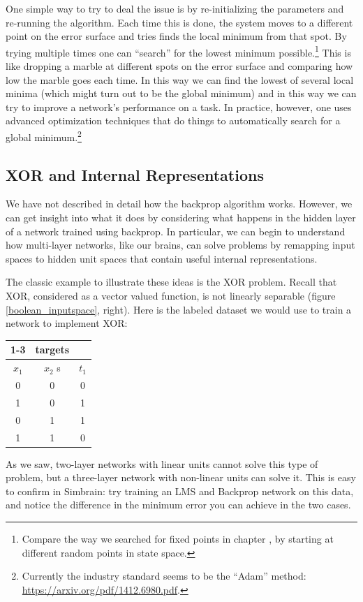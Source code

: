 One simple way to try to deal the issue is by re-initializing the parameters and re-running the algorithm. Each time this is done, the system moves to a different point on the error surface and tries finds the local minimum from that spot. By trying multiple times one can ``search'' for the lowest minimum possible.\footnote{Compare the way we searched for fixed points in chapter , by starting at different random points in state space.}  This is like dropping a marble at different spots on the error surface and comparing how low the marble goes each time. In this way we can find the lowest of several local minima (which might turn out to be the global minimum) and in this way we can try to improve a network's performance on a task. In practice, however, one uses advanced optimization techniques that do things to automatically search for a global minimum.\footnote{Currently the industry standard seems to be the ``Adam'' method: \url{https://arxiv.org/pdf/1412.6980.pdf}.}

\subsection{XOR and Internal Representations}

We have not described in detail how the backprop algorithm works. However, we can get insight into what it does by considering what happens in the hidden layer of a network trained using backprop. In particular, we can begin to understand how multi-layer networks, like our brains, can solve problems by remapping input spaces to hidden unit spaces that contain useful internal representations. 

The classic example to illustrate these ideas is the XOR problem. Recall that XOR, considered as a vector valued function, is not linearly separable (figure \ref{boolean_inputspace}, right). Here is the labeled dataset we would use to train a network to implement XOR:
\begin{center}
\begin{tabular}{| c | c || c | }
\cline{1-3}
\multicolumn{2}{| c || }{inputs}
 & \multicolumn{1}{c|}{targets} \\
\hline
  $x_1$  & $x_2$ s& $t_1$  \\
\hline
  0 & 0 & 0  \\
\hline
 1 & 0 & 1  \\
\hline
 0 & 1 & 1 \\
\hline
1 & 1 & 0 \\
\hline
\end{tabular}
\end{center}
As we saw, two-layer networks with linear units cannot solve this type of problem, but a three-layer network with non-linear units can solve it. This is easy to confirm in Simbrain: try training an LMS and Backprop network on this data, and notice the difference in the minimum error you can achieve in the two cases. %
	
